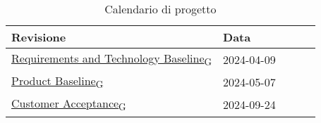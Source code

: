 \begin{table}[!h]
    \begin{center}
        \begin{tabular}{ |l |l |l |l| l| }
            \hline 
            Revisione                               & Data       \\ \hline
            \href{https://7last.github.io/docs/rtb/documentazione-interna/glossario#requirements-and-technology-baseline}{Requirements and Technology Baseline\textsubscript{G}}    & 2024-04-09 \\
            \href{https://7last.github.io/docs/rtb/documentazione-interna/glossario#product-baseline}{Product Baseline\textsubscript{G}}                        & 2024-05-07 \\
            \href{https://7last.github.io/docs/rtb/documentazione-interna/glossario#customer-acceptance}{Customer Acceptance\textsubscript{G}}                     & 2024-09-24 \\
            \hline
        \end{tabular}
    \end{center}
    \caption{Calendario di progetto}
    \label{tab:2}
\end{table}
